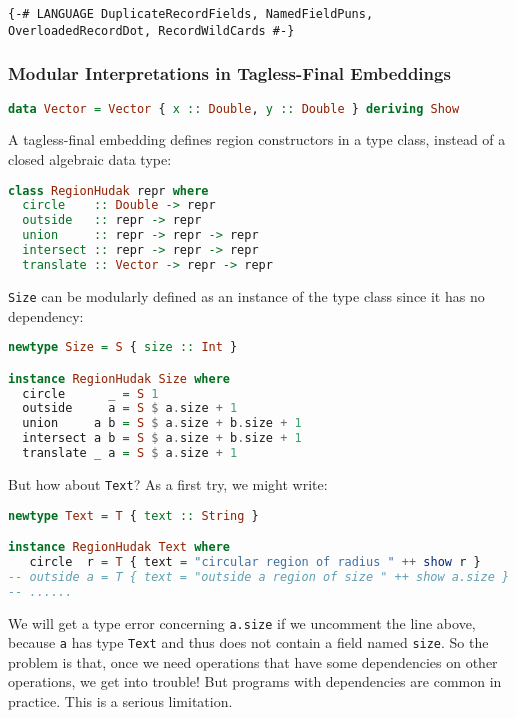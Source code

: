 \begin{lstlisting}
{-# LANGUAGE DuplicateRecordFields, NamedFieldPuns, OverloadedRecordDot, RecordWildCards #-}
\end{lstlisting}

\hypertarget{modular-interpretations-in-tagless-final-embeddings}{%
\subsubsection{Modular Interpretations in Tagless-Final
Embeddings}\label{modular-interpretations-in-tagless-final-embeddings}}

\begin{lstlisting}[language=Haskell]
data Vector = Vector { x :: Double, y :: Double } deriving Show
\end{lstlisting}
\noindent
A tagless-final embedding defines region constructors in a type class,
instead of a closed algebraic data type:

\begin{lstlisting}[language=Haskell,deletekeywords={union,intersect}]
class RegionHudak repr where
  circle    :: Double -> repr
  outside   :: repr -> repr
  union     :: repr -> repr -> repr
  intersect :: repr -> repr -> repr
  translate :: Vector -> repr -> repr
\end{lstlisting}
\noindent
\lstinline!Size! can be modularly defined as an instance
of the type class since it has no dependency:

\begin{lstlisting}[language=Haskell,deletekeywords={union,intersect}]
newtype Size = S { size :: Int }

instance RegionHudak Size where
  circle      _ = S 1
  outside     a = S $ a.size + 1
  union     a b = S $ a.size + b.size + 1
  intersect a b = S $ a.size + b.size + 1
  translate _ a = S $ a.size + 1
\end{lstlisting}
\noindent
But how about \lstinline!Text!? As a first try, we might
write:

\begin{lstlisting}[language=Haskell]
newtype Text = T { text :: String }

instance RegionHudak Text where
   circle  r = T { text = "circular region of radius " ++ show r }
-- outside a = T { text = "outside a region of size " ++ show a.size }
-- ......
\end{lstlisting}
\noindent
We will get a type error concerning \lstinline!a.size! if
we uncomment the line above, because \lstinline!a! has
type \lstinline!Text! and thus does not contain a field
named \lstinline!size!. So the problem is that, once we
need operations that have some dependencies on other operations, we get
into trouble! But programs with dependencies are common in practice.
This is a serious limitation.

